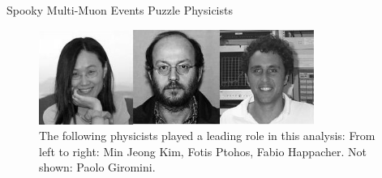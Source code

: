 \begin{multimuons-2}[enhanced, tikz={rotate=0}]{Spooky Multi-Muon Events Puzzle Physicists}
\begin{multicols}{3}
  \end{multicols}
    \begin{figure}
      \begin{center}
        \vspace{-0.2in}
        \leavevmode
        \includegraphics[width=0.8\textwidth]{./figures/Fotios-MinJeongKimBW.jpg}
        \caption*{The following physicists played a leading role in this analysis: From
          left to right: Min Jeong Kim, Fotis Ptohos, Fabio Happacher. Not shown: Paolo Giromini.}
      \end{center}
    \end{figure}
  
\end{multimuons-2}
